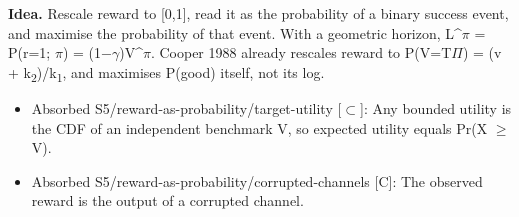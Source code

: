 \documentclass[10pt]{article}
\begin{document}
\textbf{Idea.} Rescale reward to [0,1], read it as the probability of a binary success event, and maximise the probability of that event. With a geometric horizon, L\^{}\ensuremath{\pi} = P(r=1; \ensuremath{\pi}) = (1\ensuremath{-}\ensuremath{\gamma})V\^{}\ensuremath{\pi}. Cooper 1988 already rescales reward to P(V=T\textbar{}\ensuremath{\Pi}) = (v + k\textsubscript{2})/k\textsubscript{1}, and maximises P(good) itself, not its log.
\begin{itemize}[nosep,leftmargin=1.2em]
\item Absorbed S5/reward-as-probability/target-utility [\ensuremath{\subset}]: Any bounded utility is the CDF of an independent benchmark V, so expected utility equals Pr(X \ensuremath{\geq} V).
\item Absorbed S5/reward-as-probability/corrupted-channels [C]: The observed reward is the output of a corrupted channel.
\end{itemize}
\end{document}
